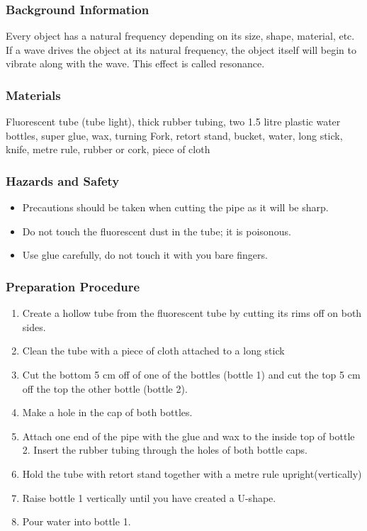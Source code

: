 \subsubsection*{Background Information}
Every object has a natural frequency depending on its size, shape, material, etc.  If a wave drives the object at its natural frequency, the object itself will begin to vibrate along with the wave.  This effect is called resonance.

\subsubsection*{Materials}
Fluorescent tube (tube light), thick rubber tubing, two 1.5 litre plastic water bottles, super glue, wax, turning Fork, retort stand, bucket, water, long stick, knife, metre rule, rubber or cork, piece of cloth

\subsubsection*{Hazards and Safety}
\begin{itemize}
\item{Precautions should be taken when cutting the pipe as it will be sharp.}
\item{Do not touch the fluorescent dust in the tube; it is poisonous.} 
\item{Use glue carefully, do not touch it with you bare fingers.} 
\end{itemize}

\subsubsection*{Preparation Procedure}
\begin{enumerate}
\item{Create a hollow tube from the fluorescent tube by cutting its rims off on both sides.} 
\item{Clean the tube with a piece of cloth attached to a long stick}
\item{Cut the bottom 5 cm off of one of the bottles (bottle 1) and cut the top 5 cm off the top the other bottle (bottle 2).} 
\item{Make a hole in the cap of both bottles.} 
\item{Attach one end of the pipe with the glue and wax to the inside top of bottle 2. Insert the rubber tubing through the holes of both bottle caps.} 
\item{Hold the tube with retort stand together with a metre rule upright(vertically)}
\item{Raise bottle 1 vertically until you have created a U-shape.} 
\item{Pour water into bottle 1.} 
\end{enumerate}

